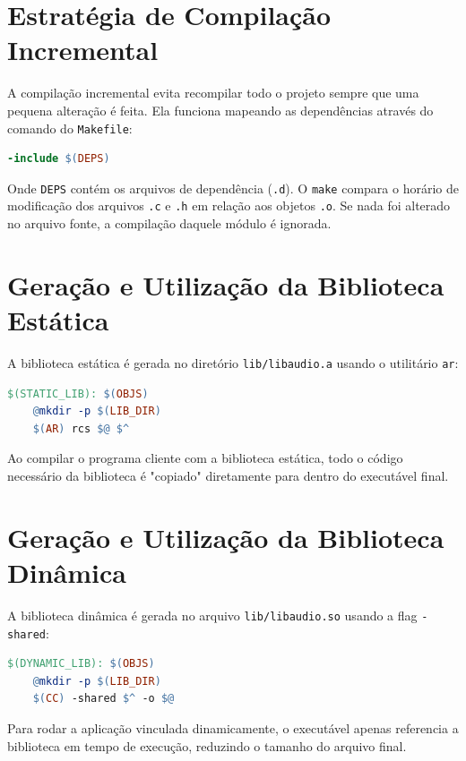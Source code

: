 \documentclass[12pt, a4paper]{article}
\begin{document}
\section{Estratégia de Compilação Incremental}
A compilação incremental evita recompilar todo o projeto sempre que uma pequena alteração é feita. Ela funciona mapeando as dependências através do comando do \texttt{Makefile}:
\begin{lstlisting}[language=make]
-include $(DEPS)
\end{lstlisting}
Onde \texttt{DEPS} contém os arquivos de dependência (\texttt{.d}). O \texttt{make} compara o horário de modificação dos arquivos \texttt{.c} e \texttt{.h} em relação aos objetos \texttt{.o}. Se nada foi alterado no arquivo fonte, a compilação daquele módulo é ignorada.

\section{Geração e Utilização da Biblioteca Estática}
A biblioteca estática é gerada no diretório \texttt{lib/libaudio.a} usando o utilitário \texttt{ar}:
\begin{lstlisting}[language=make]
$(STATIC_LIB): $(OBJS)
    @mkdir -p $(LIB_DIR)
    $(AR) rcs $@ $^
\end{lstlisting}
Ao compilar o programa cliente com a biblioteca estática, todo o código necessário da biblioteca é "copiado" diretamente para dentro do executável final.

\section{Geração e Utilização da Biblioteca Dinâmica}
A biblioteca dinâmica é gerada no arquivo \texttt{lib/libaudio.so} usando a flag \texttt{-shared}:
\begin{lstlisting}[language=make]
$(DYNAMIC_LIB): $(OBJS)
    @mkdir -p $(LIB_DIR)
    $(CC) -shared $^ -o $@
\end{lstlisting}
Para rodar a aplicação vinculada dinamicamente, o executável apenas referencia a biblioteca em tempo de execução, reduzindo o tamanho do arquivo final.
\end{document}

